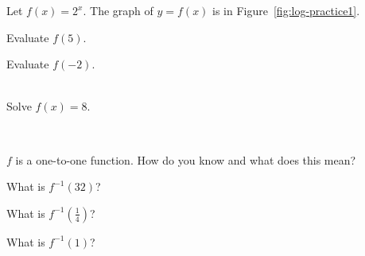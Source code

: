 \begin{myPrep}
Let $f(x) = 2^x$.  The graph of $y=f(x)$ is in Figure~\ref{fig:log-practice1}.\\
\begin{enumerate}
	\begin{minipage}{0.6\linewidth}
		\item Evaluate $f(5)$.
		\vspace{0.35 in}\\

		\item Evaluate $f(-2)$.
		\vspace{0.35 in}\\
		~

		\item Solve $f(x)=8$.
	
	\end{minipage}
	\begin{minipage}{0.4\linewidth}
		\begin{center}
		~\\[-0.8em]
		\label{fig:log-practice1}
		\end{center}
	\end{minipage}
	\vspace{0.6 in}
	
	\item $f$ is a one-to-one function. How do you know and what does this mean?
	\vfill
	\vfill
	\begin{multicols}{3}
	\item What is $f^{-1}(32)$?
	\item What is $f^{-1}(\frac{1}{4})$?
	\item What is $f^{-1}(1)$?
	\end{multicols}
	\vfill
	\end{enumerate}
\end{myPrep}

